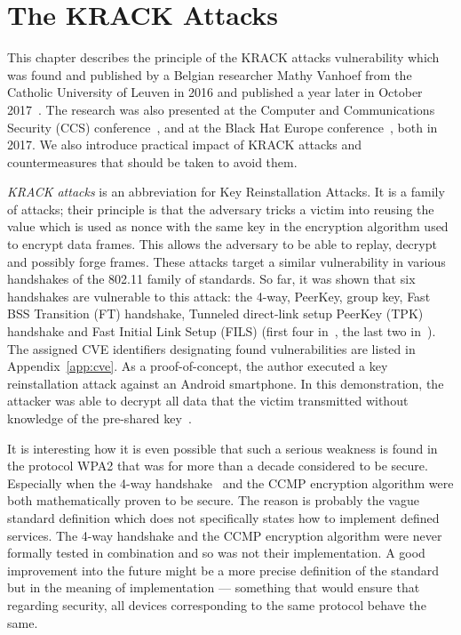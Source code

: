 \chapter{The KRACK Attacks}
\label{chap:krack}

This chapter describes the principle of the KRACK attacks vulnerability which was found and published by a Belgian researcher Mathy Vanhoef from the Catholic University of Leuven in 2016 and published a year later in October 2017~\cite{VA17}. The research was also presented at the Computer and Communications Security (CCS) conference~\cite{acm_ccs_blog}, and at the Black Hat Europe conference~\cite{black_hat_europe_2017}, both in 2017. We also introduce practical impact of KRACK attacks and countermeasures that should be taken to avoid them. 

\textit{KRACK attacks} is an abbreviation for Key Reinstallation Attacks. It is a family of attacks; their principle is that the adversary tricks a victim into reusing the value which is used as nonce with the same key in the encryption algorithm used to encrypt data frames. This allows the adversary to be able to replay, decrypt and possibly forge frames. These attacks target a similar vulnerability in various handshakes of the 802.11 family of standards. So far, it was shown that six handshakes are vulnerable to this attack: the 4-way, PeerKey, group key, Fast BSS Transition (FT) handshake, Tunneled direct-link setup PeerKey (TPK) handshake and Fast Initial Link Setup (FILS) (first four in~\cite{VA_ccs2017}, the last two in~\cite{VA_ccs2018}). The assigned CVE identifiers designating found vulnerabilities are listed in Appendix~\ref{app:cve}. As a proof-of-concept, the author executed a key reinstallation attack against an Android smartphone. In this demonstration, the attacker was able to decrypt all data that the victim transmitted without knowledge of the pre-shared key~\cite{youtubeKRACK}.

It is interesting how it is even possible that such a serious weakness is found in the protocol WPA2 that was for more than a decade considered to be secure. Especially when the 4-way handshake~\cite{Zhang:2005:SPH:2101696.2101772} and the CCMP encryption algorithm \cite{He:2005:MCP:1102120.1102124} were both mathematically proven to be secure. The reason is probably the vague standard definition which does not specifically states how to implement defined services. The 4-way handshake and the CCMP encryption algorithm were never formally tested in combination and so was not their implementation. A good improvement into the future might be a more precise definition of the standard but in the meaning of implementation --- something that would ensure that regarding security, all devices corresponding to the same protocol behave the same.

